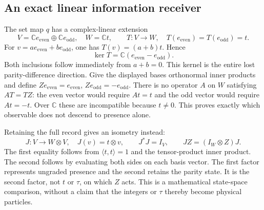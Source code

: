 \subsection{An exact linear information receiver}
The set map $q$ has a complex-linear extension
\begin{equation}\tag{PPI10}
V=\mathbb C e_{\mathrm{even}}\oplus\mathbb C e_{\mathrm{odd}},
\quad W=\mathbb C t,\qquad
T:V\to W,\quad T(e_{\mathrm{even}})=T(e_{\mathrm{odd}})=t.
\end{equation}
For $v=a e_{\mathrm{even}}+b e_{\mathrm{odd}}$, one has
$T(v)=(a+b)t$. Hence
\begin{equation}\tag{PPI11}
\ker T=\mathbb C(e_{\mathrm{even}}-e_{\mathrm{odd}}).
\end{equation}
Both inclusions follow immediately from $a+b=0$.
This kernel is the entire lost parity-difference direction.
Give the displayed bases orthonormal inner products and define
$Z e_{\mathrm{even}}=e_{\mathrm{even}}$,
$Z e_{\mathrm{odd}}=-e_{\mathrm{odd}}$. There is no operator $A$
on $W$ satisfying $AT=TZ$: the even vector would require $At=t$
and the odd vector would require $At=-t$. Over $\mathbb C$ these
are incompatible because $t\ne0$. This proves exactly which
observable does not descend to presence alone.

Retaining the full record gives an isometry instead:
\begin{equation}\tag{PPI12}
J:V\longrightarrow W\otimes V,\quad
J(v)=t\otimes v,\qquad
J^*J=I_V,\qquad JZ=(I_W\otimes Z)J.
\end{equation}
The first equality follows from $\langle t,t\rangle=1$ and the
tensor-product inner product. The second follows by evaluating
both sides on each basis vector. The first factor represents
ungraded presence and the second retains the parity state.
It is the second factor, not $t$ or $\tau$, on which $Z$ acts.
This is a mathematical state-space comparison, without a claim
that the integers or $\tau$ thereby become physical particles.

